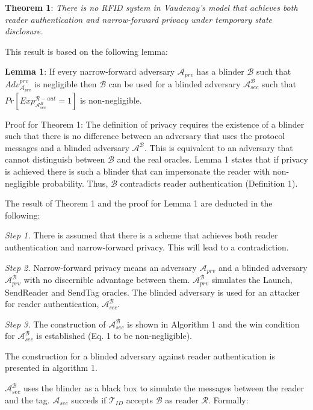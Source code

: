     \textbf{Theorem 1}: \textit{There is no RFID system in Vaudenay's model that achieves both reader authentication and narrow-forward privacy 
    under temporary state disclosure.}

    This result is based on the following lemma:

    \textbf{Lemma 1}: If every narrow-forward adversary $\mathcal{A}_{prv}$ has a blinder $\mathcal{B}$ such that $Adv_{\mathcal{A}_{prv}}^{prv}$ is negligible
    then $\mathcal{B}$ can be used for a blinded adversary $\mathcal{A}_{sec}^{\mathcal{B}}$ such that $Pr[Exp_{\mathcal{A}_{sec}^{B}}^{\mathcal{R}-aut} = 1]$ is
    non-negligible.

    Proof for Theorem 1: The definition of privacy requires the existence of a blinder such that there is no difference between an adversary that uses the 
    protocol messages and a blinded adversary $\mathcal{A}^{\mathcal{B}}$. This is equivalent to an adversary that cannot distinguish between $\mathcal{B}$
    and the real oracles. Lemma 1 states that if privacy is achieved there is such a blinder that can impersonate the reader with non-negligible probability.
    Thus, $\mathcal{B}$ contradicts reader authentication (Definition 1).

    The result of Theorem 1 and the proof for Lemma 1 are deducted in the following:

    \textit{Step 1.} There is assumed that there is a scheme that achieves both reader authentication and narrow-forward privacy. This will lead to a contradiction.
    
    \textit{Step 2.} Narrow-forward privacy means an adversary $\mathcal{A}_{prv}$ and a blinded adversary $\mathcal{A}_{prv}^{\mathcal{B}}$  with no discernible
    advantage between them. $\mathcal{A}_{prv}^{\mathcal{B}}$ simulates the Launch, SendReader and SendTag oracles.
    The blinded adversary is used for an attacker for reader authentication, $\mathcal{A}_{sec}^{\mathcal{B}}$.
    
    \textit{Step 3.} The construction of $\mathcal{A}_{sec}^{\mathcal{B}}$ is shown in Algorithm 1 and the win condition for $\mathcal{A}_{sec}^{\mathcal{B}}$
    is established (Eq. 1 to be non-negligible). 

    The construction for a blinded adversary against reader authentication is presented in algorithm 1.

    $\mathcal{A}_{sec}^{\mathcal{B}}$ uses the blinder as a black box to simulate the messages between the reader and the tag.
    $\mathcal{A}_{sec}$ succeds if $\mathcal{T}_{ID}$ accepts $\mathcal{B}$ as reader $\mathcal{R}$. Formally:

